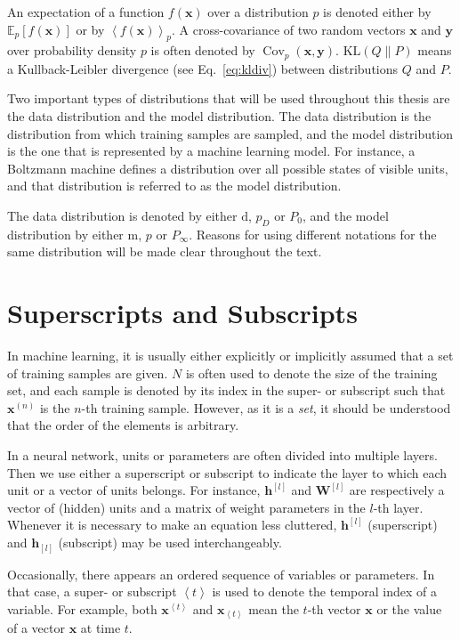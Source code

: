 \documentclass[dissertation,nocontribution]{aaltoseries}
\newcommand{\qt}[1]{\left<#1\right>}
\newcommand{\qlay}[1]{\left[#1\right]}
\newcommand{\vect}[1]{\mathbf{#1}}
\newcommand{\matr}[1]{\mathbf{#1}}
\newcommand{\cov}[0]{\operatorname{Cov}}
\newcommand{\vh}[0]{\vect{h}}
\newcommand{\vx}[0]{\vect{x}}
\newcommand{\vy}[0]{\vect{y}}
\newcommand{\mW}[0]{\matr{W}}
\newcommand{\td}[0]{\text{d}}
\newcommand{\tf}[0]{\text{m}}
\newcommand{\KL}[0]{\text{KL}}
\newcommand{\E}[0]{\mathbb{E}}
\begin{document}
An expectation of a function $f(\vx)$ over a distribution
$p$ is denoted either by $\E_p\left[ f(\vx) \right]$ or by
$\left< f(\vx) \right>_p$. A cross-covariance of two random
vectors $\vx$ and $\vy$ over probability density $p$ is
often denoted by $\cov_p(\vx, \vy)$. $\KL\left( Q \| P
\right)$ means a Kullback-Leibler divergence (see
Eq.~\eqref{eq:kldiv}) between
distributions $Q$ and $P$.

Two important types of distributions that will be used
throughout this thesis are the data distribution and the
model distribution.  The data distribution is the
distribution from which training samples are sampled, and
the model distribution is the one that is represented by a
machine learning model. For instance, a Boltzmann machine
defines a distribution over all possible states of visible
units, and that distribution is referred to as the model
distribution.

The data distribution is denoted by either $\td$, $p_D$ or $P_0$,
and the model distribution by either $\tf$, $p$ or $P_\infty$.
Reasons for using different notations for the same
distribution will be made clear throughout the text.


\section*{Superscripts and Subscripts}

In machine learning, it is usually either explicitly
or implicitly assumed that a set of training samples are
given. $N$ is often used to denote the size of the training set,
and each sample is denoted by its index in the super- or
subscript such that $\vx^{(n)}$ is the $n$-th training
sample. However, as it is a \textit{set}, it should be
understood that the order of the elements is arbitrary.

In a neural network, units or parameters are often divided
into multiple layers. Then we use either a superscript or
subscript to indicate the layer to which each unit or a
vector of units belongs. For instance, $\vh^{\qlay{l}}$ and
$\mW^{\qlay{l}}$ are respectively a vector of (hidden) units
and a matrix of weight parameters in the $l$-th layer.
Whenever it is necessary to make an equation less cluttered,
$\vh^{\qlay{l}}$ (superscript) and $\vh_{\qlay{l}}$
(subscript) may be used interchangeably.

Occasionally, there appears an ordered sequence of variables
or parameters. In that case, a super- or subscript $\qt{t}$
is used to denote the temporal index of a variable.  For
example, both $\vx^{\qt{t}}$ and $\vx_{\qt{t}}$ mean the
$t$-th vector $\vx$ or the value of a vector $\vx$ at time
$t$.
\end{document}
